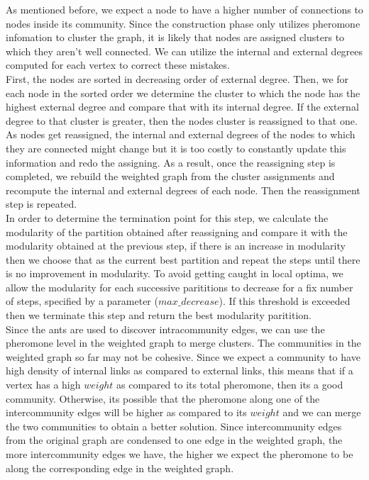 \begin{spacing}{1.5}
As mentioned before, we expect a node to have a higher number of connections to nodes inside its community. Since the construction phase only utilizes pheromone infomation to cluster the graph, it is likely that nodes are assigned clusters to which they aren't well connected. We can utilize the internal and external degrees computed for each vertex to correct these mistakes.\\
\indent First, the nodes are sorted in decreasing order of external degree. Then, we for each node in the sorted order we determine the cluster to which the node has the highest external degree and compare that with its internal degree. If the external degree to that cluster is greater, then the nodes cluster is reassigned to that one. As nodes get reassigned, the internal and external degrees of the nodes to which they are connected might change but it is too costly to constantly update this information and redo the assigning. As a result, once the reassigning step is completed, we rebuild the weighted graph from the cluster assignments and recompute the internal and external degrees of each node. Then the reassignment step is repeated. \\
\indent In order to determine the termination point for this step, we calculate the modularity of the partition obtained after reassigning and compare it with the modularity obtained at the previous step, if there is an increase in modularity then we choose that as the current best partition and repeat the steps until there is no improvement in modularity. To avoid getting caught in local optima, we allow the modularity for each successive parititions to decrease for a fix number of steps, specified by a parameter ($max\_decrease$). If this threshold is exceeded then we terminate this step and return the best modularity paritition.\\
\indent Since the ants are used to discover intracommunity edges, we can use the pheromone level in the weighted graph to merge clusters. The communities in the weighted graph so far may not be cohesive. Since we expect a community to have high density of internal links as compared to external links, this means that if a vertex has a high $weight$ as compared to its total pheromone, then its a good community. Otherwise, its possible that the pheromone along one of the intercommunity edges will be higher as compared to its $weight$ and we can merge the two communities to obtain a better solution. Since intercommunity edges from the original graph are condensed to one edge in the weighted graph, the more intercommunity edges we have, the higher we expect the pheromone to be along the corresponding edge in the weighted graph.\\

\end{spacing}
